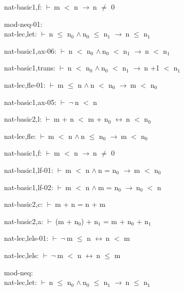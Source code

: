 \documentclass[a4paper]{article}
\newcommand{\Fol}{\mbox{$\vdash\ $}}
\newcommand{\Not}{\mbox{$\neg\ $}}
\newcommand{\And}{\mbox{$\wedge\ $}}
\newcommand{\Imp}{\mbox{$\rightarrow\ $}}
\newcommand{\Equiv}{\mbox{$\leftrightarrow\ $}}
\begin{document}
nat-basic1,f: 
 \Fol m $<$ n \Imp n $\neq$ 0



\bigskip

mod-neq-01:\\ nat-lec,let: 
 \Fol n $\le$ $\mbox{n}_{0}$ \And $\mbox{n}_{0}$ $\le$ $\mbox{n}_{1}$ \Imp n $\le$ $\mbox{n}_{1}$



nat-basic1,ax-06: 
 \Fol n $<$ $\mbox{n}_{0}$ \And $\mbox{n}_{0}$ $<$ $\mbox{n}_{1}$ \Imp n $<$ $\mbox{n}_{1}$



nat-basic1,trans: 
 \Fol n $<$ $\mbox{n}_{0}$ \And $\mbox{n}_{0}$ $<$ $\mbox{n}_{1}$ \Imp n +1 $<$ $\mbox{n}_{1}$



nat-lec,fle-01: 
 \Fol m $\le$ n \And n $<$ $\mbox{n}_{0}$ \Imp m $<$ $\mbox{n}_{0}$



nat-basic1,ax-05: 
 \Fol \Not n $<$ n



nat-basic2,l: 
 \Fol m + n $<$ m + $\mbox{n}_{0}$ \Equiv n $<$ $\mbox{n}_{0}$



nat-lec,fle: 
 \Fol m $<$ n \And n $\le$ $\mbox{n}_{0}$ \Imp m $<$ $\mbox{n}_{0}$



nat-basic1,f: 
 \Fol m $<$ n \Imp n $\neq$ 0



nat-basic1,lf-01: 
 \Fol m $<$ n \And n = $\mbox{n}_{0}$ \Imp m $<$ $\mbox{n}_{0}$



nat-basic1,lf-02: 
 \Fol m $<$ n \And m = $\mbox{n}_{0}$ \Imp $\mbox{n}_{0}$ $<$ n



nat-basic2,c: 
 \Fol m + n = n + m



nat-basic2,a: 
 \Fol (m + $\mbox{n}_{0}$) + $\mbox{n}_{1}$ = m + $\mbox{n}_{0}$ + $\mbox{n}_{1}$



nat-lec,lels-01: 
 \Fol \Not m $\le$ n \Equiv n $<$ m



nat-lec,lels: 
 \Fol \Not m $<$ n \Equiv n $\le$ m



\bigskip

mod-neq:\\ nat-lec,let: 
 \Fol n $\le$ $\mbox{n}_{0}$ \And $\mbox{n}_{0}$ $\le$ $\mbox{n}_{1}$ \Imp n $\le$ $\mbox{n}_{1}$
\end{document}
